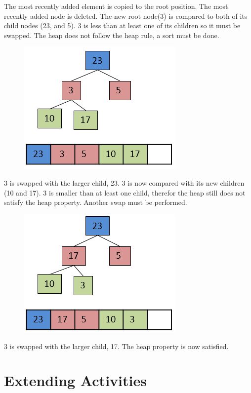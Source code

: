 The most recently added element is copied to the root position.   The most recently added node is deleted.  The new root node(3) is compared to both of its child nodes (23, and 5).   3 is less than at least one of its children so it must be swapped.   
The heap does not follow the heap rule, a sort must be done.

\begin{figure}[H]
\centering
\includegraphics{pictures/heap14.png}
\label{fig:heap14}
\end{figure}

3 is swapped with the larger child, 23.  3 is now compared with its new children (10 and 17).    3 is smaller than at least one child, therefor the heap still does not satisfy the heap property.  Another swap must be performed.

\begin{figure}[H]
\centering
\includegraphics{pictures/heap15.png}
\label{fig:heap15}
\end{figure}

3 is swapped with the larger child, 17. The heap property is now satisfied.


\section{Extending Activities}

